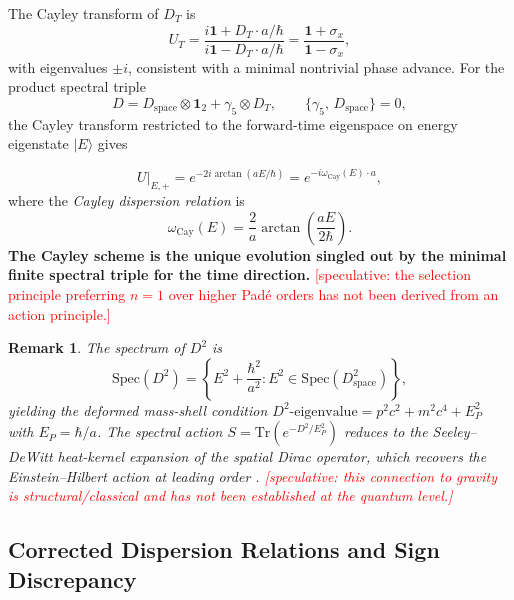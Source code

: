 \documentclass[11pt,a4paper]{article}
\newtheorem{remark}{Remark}
\begin{document}
The Cayley transform of $D_T$ is
\begin{equation}\label{eq:2}
  U_T = \frac{i\mathbf{1}+D_T\cdot a/\hbar}{i\mathbf{1}-D_T\cdot a/\hbar}
      = \frac{\mathbf{1}+\sigma_x}{\mathbf{1}-\sigma_x},
\end{equation}
with eigenvalues $\pm i$, consistent with a minimal nontrivial phase advance. For the product spectral triple
\begin{equation}\label{eq:3}
  D = D_{\mathrm{space}}\otimes\mathbf{1}_2 + \gamma_5\otimes D_T,
  \qquad
  \{\gamma_5,\,D_{\mathrm{space}}\}=0,
\end{equation}
the Cayley transform restricted to the forward-time eigenspace on energy eigenstate $|E\rangle$ gives

\begin{equation}\label{eq:4}
  \boxed{U\big|_{E,+} = e^{-2i\arctan(aE/\hbar)} = e^{-i\omega_{\mathrm{Cay}}(E)\cdot a},}
\end{equation}
where the \emph{Cayley dispersion relation} is
\begin{equation}\label{eq:5}
  \omega_{\mathrm{Cay}}(E) = \frac{2}{a}\arctan\!\left(\frac{aE}{2\hbar}\right).
\end{equation}
\textbf{The Cayley scheme is the unique evolution singled out by the minimal finite spectral triple for the time direction.} \textcolor{red}{[speculative: the selection principle preferring $n=1$ over higher Padé orders has not been derived from an action principle.]}

\begin{remark}
The spectrum of $D^2$ is
\begin{equation}\label{eq:6}
  \mathrm{Spec}(D^2) = \left\{E^2 + \frac{\hbar^2}{a^2} : E^2\in\mathrm{Spec}(D_{\mathrm{space}}^2)\right\},
\end{equation}
yielding the deformed mass-shell condition $D^2\text{-eigenvalue} = p^2c^2+m^2c^4+E_P^2$ with $E_P=\hbar/a$. The spectral action $S=\mathrm{Tr}(e^{-D^2/E_P^2})$ reduces to the Seeley--DeWitt heat-kernel expansion of the spatial Dirac operator, which recovers the Einstein--Hilbert action at leading order \cite{ashtekar2004}. \textcolor{red}{[speculative: this connection to gravity is structural/classical and has not been established at the quantum level.]}
\end{remark}

\subsection{Corrected Dispersion Relations and Sign Discrepancy}
\end{document}
